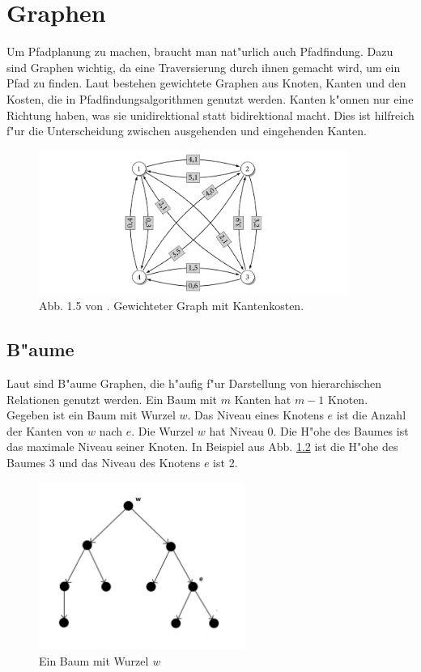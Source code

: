 \chapter{Graphen}
Um Pfadplanung zu machen, braucht man nat"urlich auch Pfadfindung. Dazu sind Graphen wichtig, da eine Traversierung durch ihnen gemacht wird, um ein Pfad zu finden. Laut \cite{Turau:15} bestehen gewichtete Graphen aus Knoten, Kanten und den Kosten, die in Pfadfindungsalgorithmen genutzt werden. Kanten k"onnen nur eine Richtung haben, was sie unidirektional statt bidirektional macht. Dies ist hilfreich f"ur die Unterscheidung zwischen ausgehenden und eingehenden Kanten.

\begin{figure} %
	\centering
	\includegraphics[width=0.9\textwidth]{images/kk_graph_S6.png}
	\caption{Abb. 1.5 von \cite[~S. 6]{Turau:15}. Gewichteter Graph mit Kantenkosten.}
	\label{sec0a}
\end{figure}

\section{B"aume}
Laut \cite{Turau:15} sind B"aume Graphen, die h"aufig f"ur Darstellung von hierarchischen Relationen genutzt werden. Ein Baum mit $m$ Kanten hat $m-1$ Knoten.\\
Gegeben ist ein Baum mit Wurzel $w$. Das Niveau eines Knotens $e$ ist die Anzahl der Kanten von $w$ nach $e$. Die Wurzel $w$ hat Niveau 0. Die H"ohe des Baumes ist das maximale Niveau seiner Knoten. In Beispiel aus Abb. \ref{sec0b} ist die H"ohe des Baumes 3 und das Niveau des Knotens $e$ ist 2.

\begin{figure} %
	\centering
	\includegraphics[width=0.6\textwidth]{images/Tree_Graph.png}
	\caption{Ein Baum mit Wurzel \textit{w}}
	\label{sec0b}
\end{figure}

